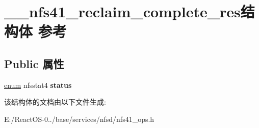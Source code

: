 \hypertarget{struct____nfs41__reclaim__complete__res}{}\section{\+\_\+\+\_\+nfs41\+\_\+reclaim\+\_\+complete\+\_\+res结构体 参考}
\label{struct____nfs41__reclaim__complete__res}
\subsection*{Public 属性}
\begin{DoxyCompactItemize}
\item 
\mbox{\label{struct____nfs41__reclaim__complete__res_add89d2f69a25cdcb50a4c025f34afa95}} 
\hyperlink{interfaceenum}{enum} nfsstat4 {\bfseries status}
\end{DoxyCompactItemize}


该结构体的文档由以下文件生成\+:\begin{DoxyCompactItemize}
\item 
E\+:/\+React\+O\+S-\/0../base/services/nfsd/nfs41\+\_\+ops.\+h\end{DoxyCompactItemize}
